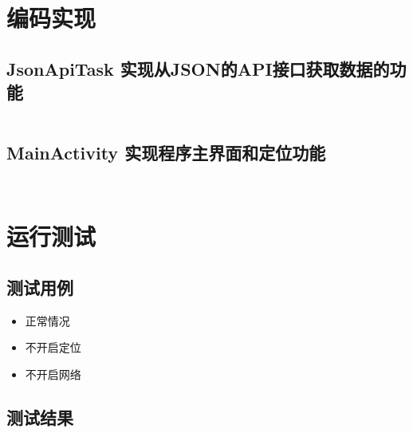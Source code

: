 \documentclass[UTF8]{ctexart}
\begin{document}
  \section{编码实现}
    \subsection{JsonApiTask 实现从JSON的API接口获取数据的功能}
      \inputminted{java}{../app/src/main/java/com/sylxjtu/prototype/JsonApiTask.java}
    \subsection{MainActivity 实现程序主界面和定位功能}
      \inputminted{java}{../app/src/main/java/com/sylxjtu/prototype/MainActivity.java}
      \inputminted{xml}{../app/src/main/res/layout/activity_main.xml}
  \section{运行测试}
    \subsection{测试用例}
      \begin{itemize}
        \item 正常情况
        \item 不开启定位
        \item 不开启网络
      \end{itemize}
    \subsection{测试结果}
\end{document}
